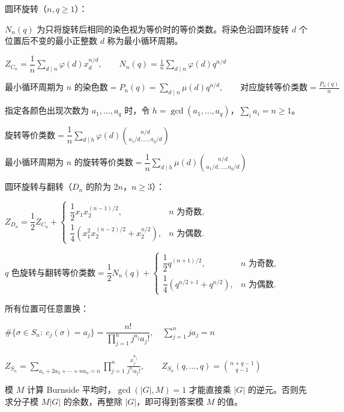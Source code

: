 圆环旋转（$n,q\ge1$）：\nopagebreak[4]

$N_n(q)$ 为只将旋转后相同的染色视为等价时的等价类数。将染色沿圆环旋转 $d$ 个位置后不变的最小正整数 $d$ 称为最小循环周期。\nopagebreak[4]

$Z_{C_n}=\dfrac1n\displaystyle\sum_{d\mid n}\varphi(d)x_d^{n/d},\qquad N_n(q)=\frac1n\sum_{d\mid n}\varphi(d)q^{n/d}$

$\text{最小循环周期为 $n$ 的染色数}=P_n(q)=\displaystyle\sum_{d\mid n}\mu(d)q^{n/d},\qquad\text{对应旋转等价类数}=\frac{P_n(q)}n$

指定各颜色出现次数为 $a_1,\dots,a_q$ 时，令 $h=\gcd(a_1,\dots,a_q)$，$\sum_i a_i=n\ge1$。\nopagebreak[4]

$\text{旋转等价类数}=\dfrac1n\displaystyle\sum_{d\mid h}\varphi(d)\binom{n/d}{a_1/d,\dots,a_q/d}$

$\text{最小循环周期为 $n$ 的旋转等价类数}=\dfrac1n\displaystyle\sum_{d\mid h}\mu(d)\binom{n/d}{a_1/d,\dots,a_q/d}$

圆环旋转与翻转（$D_n$ 的阶为 $2n$，$n\ge3$）：\nopagebreak[4]

$Z_{D_n}=\dfrac12Z_{C_n}+\begin{cases}\dfrac12x_1x_2^{(n-1)/2},&n\text{ 为奇数},\\\dfrac14\left(x_1^2x_2^{(n-2)/2}+x_2^{n/2}\right),&n\text{ 为偶数}.\end{cases}$

$\text{$q$ 色旋转与翻转等价类数}=\dfrac12N_n(q)+\begin{cases}\dfrac12q^{(n+1)/2},&n\text{ 为奇数},\\\dfrac14\left(q^{n/2+1}+q^{n/2}\right),&n\text{ 为偶数}.\end{cases}$

所有位置可任意置换：\nopagebreak[4]

$\#\{\sigma\in S_n:\ c_j(\sigma)=a_j\}=\dfrac{n!}{\prod_{j=1}^{n}j^{a_j}a_j!},\quad\sum_{j=1}^{n}ja_j=n$

$Z_{S_n}=\displaystyle\sum_{a_1+2a_2+\cdots+na_n=n}\prod_{j=1}^{n}\frac{x_j^{a_j}}{j^{a_j}a_j!},\qquad Z_{S_n}(q,\dots,q)=\binom{n+q-1}{q-1}$

模 $M$ 计算 Burnside 平均时，$\gcd(|G|,M)=1$ 才能直接乘 $|G|$ 的逆元。否则先求分子模 $M|G|$ 的余数，再整除 $|G|$，即可得到答案模 $M$ 的值。
